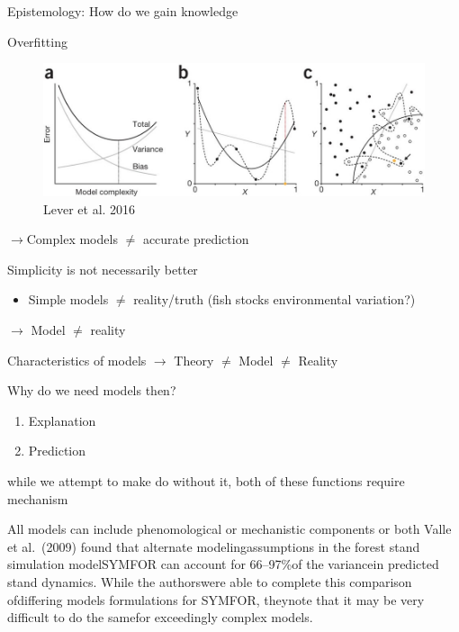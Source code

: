 \documentclass[
  ignorenonframetext,
]{beamer}
\providecommand{\tightlist}{%
  \setlength{\itemsep}{0pt}\setlength{\parskip}{0pt}}
\begin{document}
\begin{frame}{Epistemology: How do we gain knowledge}
\begin{block}{Overfitting}
\begin{figure}

{\centering \includegraphics[width=0.8\linewidth]{overfit} 

}

\caption{Lever et al. 2016}\label{fig:p3}
\end{figure}

{\(\rightarrow\)}Complex models \(\neq\) accurate prediction
\end{block}

\begin{block}{Simplicity is not necessarily better}
\protect\hypertarget{simplicity-is-not-necessarily-better}{}
\begin{itemize}
\tightlist
\item
  Simple models \(\neq\) reality/truth (fish stocks environmental
  variation?)
\end{itemize}

{\(\rightarrow\)} Model \(\neq\) reality
\end{block}

\begin{block}{Characteristics of models}
\protect\hypertarget{characteristics-of-models-1}{}
{\(\rightarrow\)} Theory \(\neq\) Model \(\neq\) Reality
\end{block}

\begin{block}{Why do we need models then?}
\protect\hypertarget{why-do-we-need-models-then}{}
\begin{enumerate}
\tightlist
\item
  Explanation
\item
  Prediction
\end{enumerate}

while we attempt to make do without it, both of these functions require
mechanism
\end{block}

\begin{block}{All models can include phenomological or mechanistic
components or both}
\protect\hypertarget{all-models-can-include-phenomological-or-mechanistic-components-or-both}{}
Valle et al.~(2009) found that alternate modelingassumptions in the
forest stand simulation modelSYMFOR can account for 66--97\%of the
variancein predicted stand dynamics. While the authorswere able to
complete this comparison ofdiffering models formulations for SYMFOR,
theynote that it may be very difficult to do the samefor exceedingly
complex models.
\end{block}
\end{frame}
\end{document}
